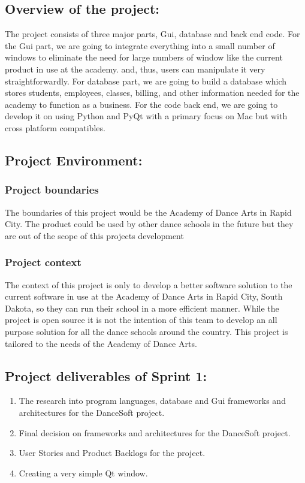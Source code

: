 \subsection{Overview of the project:}
The project consists of three major parts, Gui, database and back end code. For the Gui part, we are going to integrate everything into a small number of windows to eliminate the need for large numbers of window like the current product in use at the academy. and, thus, users can manipulate it very straightforwardly. For database part, we are going to build a database which stores students, employees, classes, billing, and other information needed for the academy to function as a business. For the code back end, we are going to develop it on using Python and PyQt with a primary focus on Mac but with cross platform compatibles. 

\subsection{Project Environment:}

\subsubsection{Project boundaries}
The boundaries of this project would be the Academy of Dance Arts in Rapid City. The product could be used by other dance schools in the future but they are out of the scope of this projects development 

\subsubsection{Project context}
The context of this project is only to develop a better software solution to the current software in use at the Academy of Dance Arts in Rapid City, South Dakota, so they can run their school in a more efficient manner. While the project is open source it is not the intention of this team to develop an all purpose solution for all the dance schools around the country. This project is tailored to the needs of the Academy of Dance Arts.


\subsection{Project deliverables of Sprint 1:}

\begin{enumerate}
\item The research into program languages, database and Gui frameworks and architectures for the DanceSoft project.
\item Final decision on frameworks and architectures for the DanceSoft project.
\item User Stories and Product Backlogs for the project.
\item Creating a very simple Qt window.
\end{enumerate}

